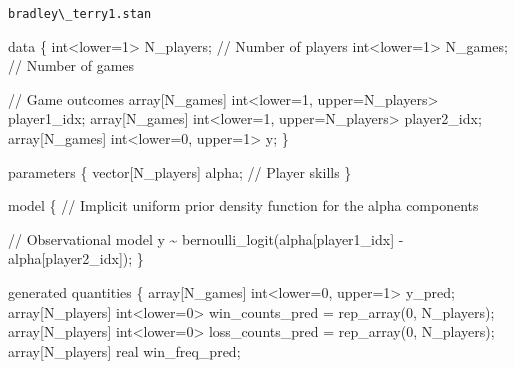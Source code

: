 \documentclass[
  letterpaper,
  DIV=11,
  numbers=noendperiod]{scrartcl}
\newenvironment{Shaded}{\begin{snugshade}}{\end{snugshade}}
\newcommand{\CommentTok}[1]{\textcolor[rgb]{0.37,0.37,0.37}{#1}}
\newcommand{\DataTypeTok}[1]{\textcolor[rgb]{0.68,0.00,0.00}{#1}}
\newcommand{\DecValTok}[1]{\textcolor[rgb]{0.68,0.00,0.00}{#1}}
\newcommand{\KeywordTok}[1]{\textcolor[rgb]{0.00,0.23,0.31}{#1}}
\newcommand{\NormalTok}[1]{\textcolor[rgb]{0.00,0.23,0.31}{#1}}
\begin{document}
\begin{codelisting}

\caption{\texttt{bradley\textbackslash\_terry1.stan}}

\begin{Shaded}
\begin{Highlighting}[]
\KeywordTok{data}\NormalTok{ \{}
  \DataTypeTok{int}\NormalTok{\textless{}}\KeywordTok{lower}\NormalTok{=}\DecValTok{1}\NormalTok{\textgreater{} N\_players; }\CommentTok{// Number of players}
  \DataTypeTok{int}\NormalTok{\textless{}}\KeywordTok{lower}\NormalTok{=}\DecValTok{1}\NormalTok{\textgreater{} N\_games;   }\CommentTok{// Number of games}

  \CommentTok{// Game outcomes}
  \DataTypeTok{array}\NormalTok{[N\_games] }\DataTypeTok{int}\NormalTok{\textless{}}\KeywordTok{lower}\NormalTok{=}\DecValTok{1}\NormalTok{, }\KeywordTok{upper}\NormalTok{=N\_players\textgreater{} player1\_idx;}
  \DataTypeTok{array}\NormalTok{[N\_games] }\DataTypeTok{int}\NormalTok{\textless{}}\KeywordTok{lower}\NormalTok{=}\DecValTok{1}\NormalTok{, }\KeywordTok{upper}\NormalTok{=N\_players\textgreater{} player2\_idx;}
  \DataTypeTok{array}\NormalTok{[N\_games] }\DataTypeTok{int}\NormalTok{\textless{}}\KeywordTok{lower}\NormalTok{=}\DecValTok{0}\NormalTok{, }\KeywordTok{upper}\NormalTok{=}\DecValTok{1}\NormalTok{\textgreater{} y;}
\NormalTok{\}}

\KeywordTok{parameters}\NormalTok{ \{}
  \DataTypeTok{vector}\NormalTok{[N\_players] alpha; }\CommentTok{// Player skills}
\NormalTok{\}}

\KeywordTok{model}\NormalTok{ \{}
  \CommentTok{// Implicit uniform prior density function for the alpha components}

  \CommentTok{// Observational model}
\NormalTok{  y \textasciitilde{} bernoulli\_logit(alpha[player1\_idx] {-} alpha[player2\_idx]);}
\NormalTok{\}}

\KeywordTok{generated quantities}\NormalTok{ \{}
  \DataTypeTok{array}\NormalTok{[N\_games] }\DataTypeTok{int}\NormalTok{\textless{}}\KeywordTok{lower}\NormalTok{=}\DecValTok{0}\NormalTok{, }\KeywordTok{upper}\NormalTok{=}\DecValTok{1}\NormalTok{\textgreater{} y\_pred;}
  \DataTypeTok{array}\NormalTok{[N\_players] }\DataTypeTok{int}\NormalTok{\textless{}}\KeywordTok{lower}\NormalTok{=}\DecValTok{0}\NormalTok{\textgreater{} win\_counts\_pred}
\NormalTok{    = rep\_array(}\DecValTok{0}\NormalTok{, N\_players);}
  \DataTypeTok{array}\NormalTok{[N\_players] }\DataTypeTok{int}\NormalTok{\textless{}}\KeywordTok{lower}\NormalTok{=}\DecValTok{0}\NormalTok{\textgreater{} loss\_counts\_pred}
\NormalTok{    = rep\_array(}\DecValTok{0}\NormalTok{, N\_players);}
  \DataTypeTok{array}\NormalTok{[N\_players] }\DataTypeTok{real}\NormalTok{ win\_freq\_pred;}


\end{Highlighting}
\end{Shaded}
\end{codelisting}
\end{document}
